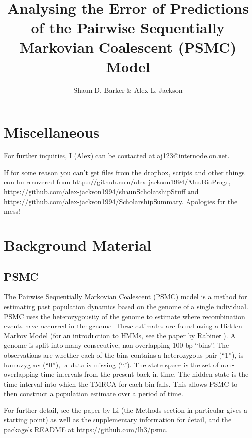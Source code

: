 \documentclass[11pt,a4paper]{article}
\title{Analysing the Error of Predictions of the Pairwise Sequentially Markovian Coalescent (PSMC) Model}
\author{Shaun D. Barker & Alex L. Jackson}
\begin{document}
\maketitle

%
\section{Miscellaneous}
For further inquiries, I (Alex) can be contacted at \href{mailto:aj123@internode.on.net}{aj123@internode.on.net}.

If for some reason you can't get files from the dropbox, scripts and other things can be recovered from \url{https://github.com/alex-jackson1994/AlexBioProgs}, \url{https://github.com/alex-jackson1994/shaunScholarshipStuff} and \url{https://github.com/alex-jackson1994/ScholarshipSummary}. Apologies for the mess!

\section{Background Material}
\subsection{PSMC}
The Pairwise Sequentially Markovian Coalescent (PSMC) model \cite{li2011inference} is a method for estimating past population dynamics based on the  genome of a single individual. PSMC uses the heterozygousity of the genome to estimate where recombination events have occurred in the genome. These estimates are found using a Hidden Markov Model (for an introduction to HMMs, see the paper by Rabiner \cite{rabiner1989tutorial}). A genome is split into many consecutive, non-overlapping 100 bp ``bins''. The observations are whether each of the bins contains a heterozygous pair (``1''), is homozygous (``0''), or data is missing (``.''). The state space is the set of non-overlapping time intervals from the present back in time. The hidden state is the time interval into which the TMRCA for each bin falls. This allows PSMC to then construct a population estimate over a period of time. 

For further detail, see the paper by Li \cite{li2011inference} (the Methods section in particular gives a starting point) as well as the supplementary information for detail, and the package's README at \url{https://github.com/lh3/psmc}.
\end{document}
